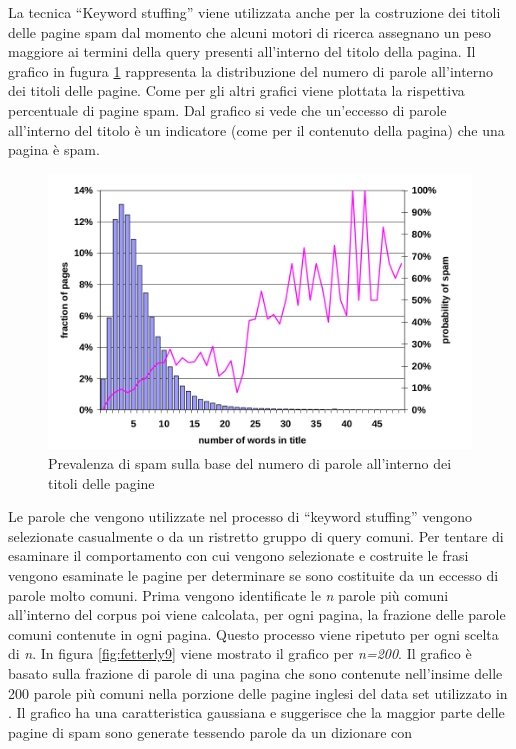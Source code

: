 La tecnica ``Keyword stuffing'' viene utilizzata anche per la costruzione dei titoli delle pagine spam dal momento che alcuni motori di ricerca assegnano un peso maggiore ai termini della query presenti all'interno del titolo della pagina. Il grafico in fugura \ref{fig:fetterly4} rappresenta la distribuzione del numero di parole all'interno dei titoli delle pagine. Come per gli altri grafici viene plottata la rispettiva percentuale di pagine spam. Dal grafico si vede che un'eccesso di parole all'interno del titolo è un indicatore (come per il contenuto della pagina) che una pagina è spam.
\begin{figure}[htbp]
\centering
\includegraphics[width=12cm]{immagini/fetterly/fetterly4}
\caption{Prevalenza di spam sulla base del numero di parole all'interno dei titoli delle pagine}
\label{fig:fetterly4}
\end{figure}
Le parole che vengono utilizzate nel processo di ``keyword stuffing'' vengono selezionate casualmente o da un ristretto gruppo di query comuni. Per tentare di esaminare il comportamento con cui vengono selezionate e costruite le frasi vengono esaminate le pagine per  determinare se sono costituite da un eccesso di parole molto comuni. Prima vengono identificate le \textit{n} parole più comuni all'interno del corpus poi viene calcolata, per ogni pagina, la frazione delle parole comuni contenute in ogni pagina. Questo processo viene ripetuto per ogni scelta di \textit{n}. In figura \ref{fig:fetterly9} viene mostrato il grafico per \textit{n=200}. Il grafico è basato sulla frazione di parole di una pagina che sono contenute nell'insime delle 200 parole più comuni nella porzione delle pagine inglesi del data set utilizzato in \cite{Ntoulas:2006:DSW:1135777.1135794}. Il grafico ha una caratteristica gaussiana e suggerisce che la maggior parte delle pagine di spam sono generate tessendo parole da un dizionare con 
